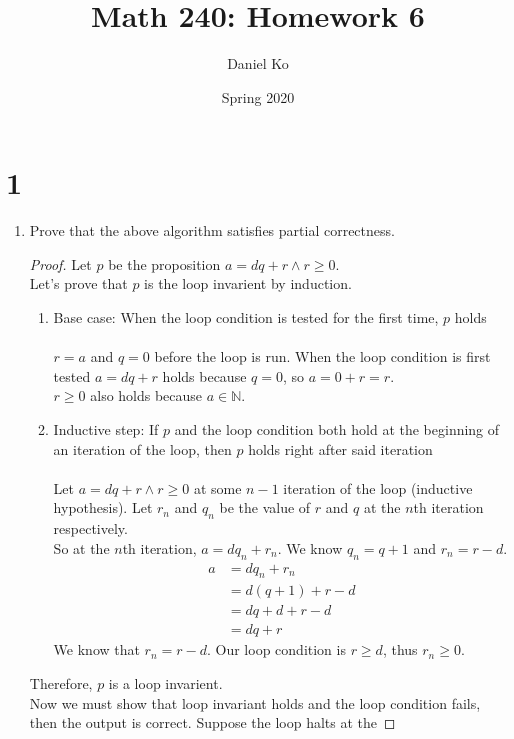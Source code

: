 \documentclass[11pt]{scrartcl}
\title{Math 240: Homework 6}
\author{Daniel Ko}
\date{Spring 2020}
\begin{document}
\maketitle

\section{1}
\begin{enumerate}[label=\alph*.]
	\item{
		Prove that the above algorithm satisfies partial correctness.
		\begin{proof}
			Let $p$ be the proposition
			$a = dq + r \land r \geq 0$.\\
			Let's prove that $p$ is the loop invarient by induction.
			\begin{enumerate}[label=\roman*.]
			\item{
				Base case: When the loop condition is tested for the first time, $p$ holds\\
				\-\\
				$r=a$ and $q=0$ before the loop is run. 
				When the loop condition is first tested $a = dq + r$ holds because $q=0$, so
				$a = 0 + r = r$. \\
				$r \geq 0$ also holds because $a \in \mathbb{N}$. 
			}
			\item{
				Inductive step: If $p$ and the loop condition both hold at the beginning of an
				iteration of the loop, then $p$ holds right after said iteration\\
				\-\\
				Let $a = dq + r \land r \geq 0$ at some $n-1$ iteration of the loop (inductive hypothesis).
				Let $r_n$ and $q_n$ be the value of $r$ and $q$ at the $n$th iteration respectively. \\
				So at the $n$th iteration, $a=dq_n + r_n$. We know $q_n = q + 1$ and $r_n = r - d$.
				\begin{align*}
				a & = dq_n + r_n\\	
				& = d(q + 1) + r - d\\
				& = dq + d + r - d \\
				& = dq + r 
				\end{align*}
				We know that $r_n = r - d$. 
				Our loop condition is $r \geq d$, thus $r_n \geq 0$.
			}
			\end{enumerate}
		Therefore, $p$ is a loop invarient. \\
		Now we must show that loop invariant holds
		and the loop condition fails, then the output is correct. Suppose the loop halts at the 

\end{proof}}
\end{enumerate}
\end{document}
